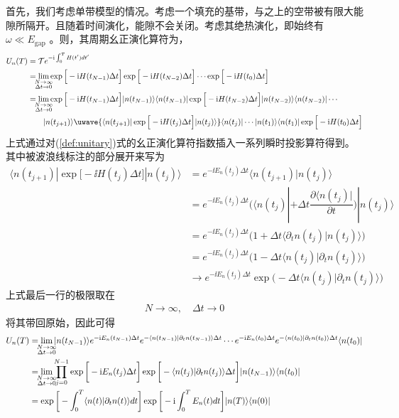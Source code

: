 首先，我们考虑单带模型的情况。考虑一个填充的基带，与之上的空带被有限大能隙所隔开。且随着时间演化，能隙不会关闭。考虑其绝热演化，即始终有 $\omega\ll E_{\text{gap}}$ 。则，其周期幺正演化算符为，
\begin{align}
U_n(T)&=\mathcal{T}e^{-\ii\int_{0}^T H(t')dt'}\\
&= \lim_{\mathclap{\substack{N\rightarrow\infty\\\Delta t\rightarrow0}}}\exp\Big[-\ii H(t_{N-1})\Delta t\Big]\exp\Big[-\ii H(t_{N-2})\Delta t\Big]\cdots\exp\Big[-\ii H(t_0)\Delta t\Big]\\
&= \lim_{\mathclap{\substack{N\rightarrow\infty\\\Delta t\rightarrow0}}}\exp\Big[-\ii H(t_{N-1})\Delta t\Big]|n(t_{N-1})\rangle\langle n(t_{N-1})|\exp\Big[-\ii H(t_{N-2})\Delta t\Big]|n(t_{N-2})\rangle\langle n(t_{N-2})|\cdots\\
&\qquad|n(t_{j+1})\rangle\uwave{\langle n(t_{j+1})|\exp\Big[-\ii H(t_j)\Delta t\Big]|n(t_{j})\rangle}\langle n(t_{j})|\cdots|n(t_{1})\rangle\langle n(t_{1})|\exp\Big[-\ii H(t_0)\Delta t\Big]
\end{align}
上式通过对(\ref{def:unitary})式的幺正演化算符指数插入一系列瞬时投影算符得到。其中被波浪线标注的部分展开来写为
\begin{align}
\langle n(t_{j+1})|\exp\Big[-\ii H(t_j)\Delta t\Big]|n(t_{j})\rangle
&= e^{-\ii E_n(t_j)\Delta t}\langle n(t_{j+1})|n(t_j)\rangle\\
&= e^{-\ii E_n(t_j)\Delta t}\bigg(\langle n(t_{j})|+\Delta t\dfrac{\partial\langle n(t_j)|}{\partial t}\bigg)|n(t_j)\rangle\\
&= e^{-\ii E_n(t_j)\Delta t}\bigg(1+\Delta t\langle\partial_t n(t_j)|n(t_j)\rangle\bigg)\\
&= e^{-\ii E_n(t_j)\Delta t}\bigg(1-\Delta t\langle n(t_j)|\partial_tn(t_j)\rangle\bigg)\\
&\rightarrow e^{-\ii E_n(t_j)\Delta t}\exp\bigg(-\Delta t\langle n(t_j)|\partial_tn(t_j)\rangle\bigg)
\end{align}
上式最后一行的极限取在
\begin{align}
N\rightarrow\infty, \quad\Delta t\rightarrow0
\end{align}
将其带回原始，因此可得
\begin{align}\label{eq:ut-adiab-single-details}
U_n(T)&=\lim_{\mathclap{\substack{N\rightarrow\infty\\\Delta t\rightarrow0}}}|n(t_{N-1})\rangle e^{-\ii E_n(t_{N-1})\Delta t}e^{-\langle n(t_{N-1})|\partial_tn(t_{N-1})\rangle\Delta t}\cdots e^{-\ii E_n(t_0)\Delta t}e^{-\langle n(t_0)|\partial_tn(t_0)\rangle\Delta t}\langle n(t_0)|\\
&= \lim_{\mathclap{\substack{N\rightarrow\infty\\\Delta t\rightarrow0}}}\prod_{j=0}^{N-1}\exp\bigg[-\ii E_n(t_j)\Delta t\bigg]\exp\bigg[-\langle n(t_j)|\partial_tn(t_j)\rangle\Delta t\bigg]|n(t_{N-1})\rangle\langle n(t_0)|\\
&= \exp\bigg[-\int_0^T\langle n(t)|\partial_tn(t)\rangle dt\bigg]\exp\bigg[-\ii\int_0^TE_n(t)dt\bigg]|n(T)\rangle\langle n(0)|
\end{align}

